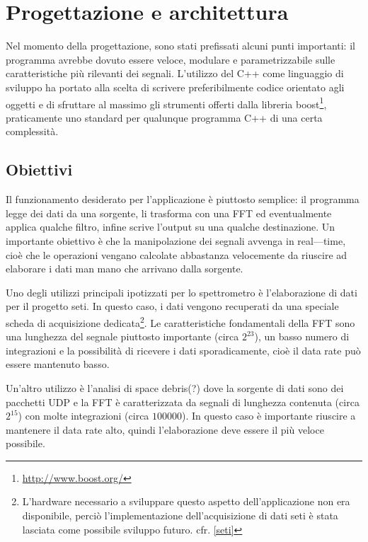 \chapter{Progettazione e architettura}
\label{outline}
Nel momento della progettazione, sono stati prefissati alcuni punti importanti:
il programma avrebbe dovuto essere veloce, modulare e parametrizzabile sulle
caratteristiche pi\`u rilevanti dei segnali. L'utilizzo del C++ come linguaggio di
sviluppo ha portato alla scelta di scrivere preferibilmente codice orientato
agli oggetti e di sfruttare al massimo gli strumenti offerti dalla libreria
boost\footnote{\url{http://www.boost.org/}}, praticamente uno standard per qualunque programma C++ di una certa
complessit\`a.
\section{Obiettivi}
Il funzionamento desiderato per l'applicazione \`e piuttosto semplice: il
programma legge dei dati da una sorgente, li trasforma con una \ac{FFT} ed
eventualmente applica qualche filtro, infine scrive l'output su una qualche
destinazione. Un importante obiettivo \`e che la manipolazione dei segnali
avvenga in real---time, cio\`e che le operazioni vengano calcolate abbastanza
velocemente da riuscire ad elaborare i dati man mano che arrivano dalla
sorgente.

Uno degli utilizzi principali ipotizzati per lo spettrometro \`e l'elaborazione
di dati per il progetto \ac{seti}. In questo caso, i dati vengono recuperati da
una speciale scheda di acquisizione dedicata\footnote{L'hardware necessario a
sviluppare questo aspetto dell'applicazione non era disponibile, perci\`o
    l'implementazione dell'acquisizione di dati \ac{seti} \`e stata lasciata
    come possibile sviluppo futuro. cfr. \ref{seti}}.
Le caratteristiche fondamentali della \ac{FFT} sono una lunghezza del segnale
piuttosto importante (circa $2^{23}$), un basso numero di integrazioni e la
possibilit\`a di ricevere i dati sporadicamente, cio\`e il data rate pu\`o
essere mantenuto basso.

Un'altro utilizzo \`e l'analisi di space debris(?) dove la sorgente di dati sono
dei pacchetti UDP e la \ac{FFT} \`e caratterizzata da segnali di lunghezza contenuta
(circa $2^{15}$) con molte integrazioni (circa $100000$). In questo caso \`e
importante riuscire a mantenere il data rate alto, quindi l'elaborazione deve
essere il pi\`u veloce possibile.

